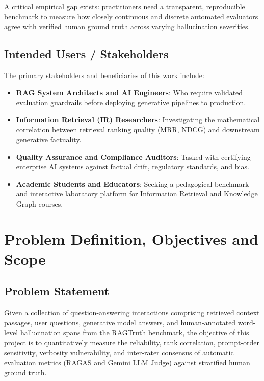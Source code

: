 \documentclass[11pt,a4paper]{article}
\begin{document}
A critical empirical gap exists: practitioners need a transparent, reproducible benchmark to measure how closely continuous and discrete automated evaluators agree with verified human ground truth across varying hallucination severities.

\subsection{Intended Users / Stakeholders}
The primary stakeholders and beneficiaries of this work include:
\begin{itemize}[leftmargin=*]
    \item \textbf{RAG System Architects and AI Engineers}: Who require validated evaluation guardrails before deploying generative pipelines to production.
    \item \textbf{Information Retrieval (IR) Researchers}: Investigating the mathematical correlation between retrieval ranking quality (MRR, NDCG) and downstream generative factuality.
    \item \textbf{Quality Assurance and Compliance Auditors}: Tasked with certifying enterprise AI systems against factual drift, regulatory standards, and bias.
    \item \textbf{Academic Students and Educators}: Seeking a pedagogical benchmark and interactive laboratory platform for Information Retrieval and Knowledge Graph courses.
\end{itemize}

\section{Problem Definition, Objectives and Scope}

\subsection{Problem Statement}
Given a collection of question-answering interactions comprising retrieved context passages, user questions, generative model answers, and human-annotated word-level hallucination spans from the RAGTruth benchmark, the objective of this project is to quantitatively measure the reliability, rank correlation, prompt-order sensitivity, verbosity vulnerability, and inter-rater consensus of automatic evaluation metrics (RAGAS and Gemini LLM Judge) against stratified human ground truth.
\end{document}
